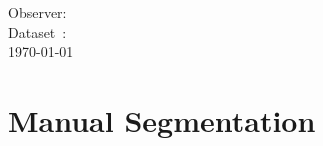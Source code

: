 \documentclass[11pt,a4paper,oneside]{article}
\begin{document}




\begin{flushleft}
	Observer: \textbf{\Observer}\\
	Dataset~: \textbf{\Dataset}\\
	\today
\end{flushleft}

\section*{Manual Segmentation}
\end{document}
